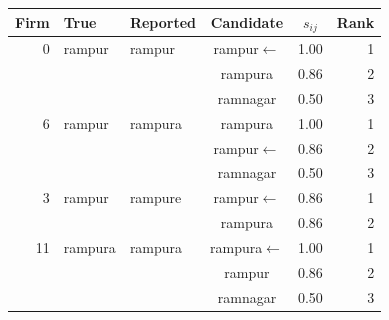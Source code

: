 \begin{tabular}{rllccr}
\toprule
Firm & True & Reported & Candidate & $s_{ij}$ & Rank \\
\midrule
0 & rampur & rampur & rampur$\leftarrow$ & 1.00 & 1 \\
 &  &  & rampura & 0.86 & 2 \\
 &  &  & ramnagar & 0.50 & 3 \\
\midrule
6 & rampur & rampura & rampura & 1.00 & 1 \\
 &  &  & rampur$\leftarrow$ & 0.86 & 2 \\
 &  &  & ramnagar & 0.50 & 3 \\
\midrule
3 & rampur & rampure & rampur$\leftarrow$ & 0.86 & 1 \\
 &  &  & rampura & 0.86 & 2 \\
\midrule
11 & rampura & rampura & rampura$\leftarrow$ & 1.00 & 1 \\
 &  &  & rampur & 0.86 & 2 \\
 &  &  & ramnagar & 0.50 & 3 \\
\bottomrule
\end{tabular}
